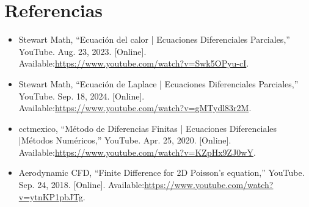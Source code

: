 \documentclass[12pt]{article}
\begin{document}
    \section{Referencias}
    \begin{itemize}
        \item Stewart Math, “Ecuación del calor | Ecuaciones Diferenciales Parciales,” YouTube. Aug. 23, 2023. [Online]. Available:\newline \url{https://www.youtube.com/watch?v=Swk5OPyu-cI}.
        \item Stewart Math, “Ecuación de Laplace | Ecuaciones Diferenciales Parciales,” YouTube. Sep. 18, 2024. [Online]. Available:\newline \url{https://www.youtube.com/watch?v=gMTydl83r2M}.
        \item cctmexico, “Método de Diferencias Finitas | Ecuaciones Diferenciales |Métodos Numéricos,” YouTube. Apr. 25, 2020. [Online]. Available:\newline \url{https://www.youtube.com/watch?v=KZpHx9ZJ0wY}.
        \item Aerodynamic CFD, “Finite Difference for 2D Poisson’s equation,” YouTube. Sep. 24, 2018. [Online]. Available:\newline \url{https://www.youtube.com/watch?v=ytnKP1pbJTg}.
    \end{itemize}
\end{document}
